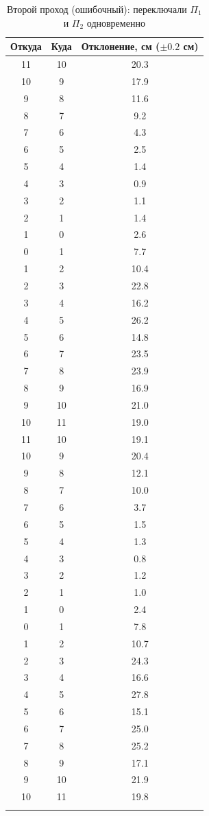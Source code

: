 \documentclass[a4paper]{article}
\begin{document}
	\begin{longtable}{|c|c|c|}
		\hline
		Откуда & Куда & Отклонение, см ($\pm 0.2$ см) \\
		\hline
		11 & 10 & 20.3 \\ \hline
		10 & 9 & 17.9 \\ \hline
		9 & 8 & 11.6 \\ \hline
		8 & 7 & 9.2 \\ \hline
		7 & 6 & 4.3 \\ \hline
		6 & 5 & 2.5 \\ \hline
		5 & 4 & 1.4 \\ \hline
		4 & 3 & 0.9 \\ \hline
		3 & 2 & 1.1 \\ \hline
		2 & 1 & 1.4 \\ \hline
		1 & 0 & 2.6 \\ \hline
		0 & 1 & 7.7 \\ \hline
		1 & 2 & 10.4 \\ \hline
		2 & 3 & 22.8 \\ \hline
		3 & 4 & 16.2 \\ \hline
		4 & 5 & 26.2 \\ \hline
		5 & 6 & 14.8 \\ \hline
		6 & 7 & 23.5 \\ \hline
		7 & 8 & 23.9 \\ \hline
		8 & 9 & 16.9 \\ \hline
		9 & 10 & 21.0 \\ \hline
		10 & 11 & 19.0 \\ \hline
		11 & 10 & 19.1 \\ \hline
		10 & 9 & 20.4 \\ \hline
		9 & 8 & 12.1 \\ \hline
		8 & 7 & 10.0 \\ \hline
		7 & 6 & 3.7 \\ \hline
		6 & 5 & 1.5 \\ \hline
		5 & 4 & 1.3 \\ \hline
		4 & 3 & 0.8 \\ \hline
		3 & 2 & 1.2 \\ \hline
		2 & 1 & 1.0 \\ \hline
		1 & 0 & 2.4 \\ \hline
		0 & 1 & 7.8 \\ \hline
		1 & 2 & 10.7 \\ \hline
		2 & 3 & 24.3 \\ \hline
		3 & 4 & 16.6 \\ \hline
		4 & 5 & 27.8 \\ \hline
		5 & 6 & 15.1 \\ \hline
		6 & 7 & 25.0 \\ \hline
		7 & 8 & 25.2 \\ \hline
		8 & 9 & 17.1 \\ \hline
		9 & 10 & 21.9 \\ \hline
		10 & 11 & 19.8 \\ \hline
		\caption{Второй проход (ошибочный): переключали $\Pi_1$ и $\Pi_2$ одновременно}
		\label{tab:second_attempt}
	\end{longtable}
	
\end{document}
